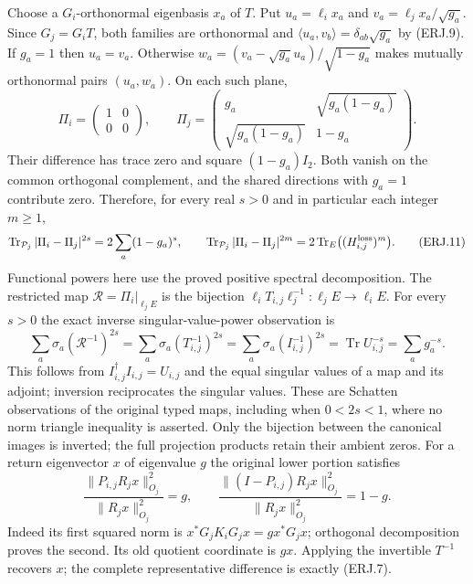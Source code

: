 \documentclass[11pt]{article}
\newcommand{\Tr}{\operatorname{Tr}}\newcommand{\diag}{\operatorname{diag}}
\begin{document}
Choose a $G_i$-orthonormal eigenbasis $x_a$ of $T$. Put
$u_a=\ell_ix_a$ and $v_a=\ell_jx_a/\sqrt{g_a}$.
Since $G_j=G_iT$, both families are orthonormal and
$\langle u_a,v_b\rangle=\delta_{ab}\sqrt{g_a}$ by (ERJ.9).
If $g_a=1$ then $u_a=v_a$. Otherwise
$w_a=(v_a-\sqrt{g_a}u_a)/\sqrt{1-g_a}$ makes mutually
orthonormal pairs $(u_a,w_a)$. On each such plane,
\[
 \Pi_i=\begin{pmatrix}1&0\\0&0\end{pmatrix},\qquad
 \Pi_j=\begin{pmatrix}g_a&\sqrt{g_a(1-g_a)}\\
                    \sqrt{g_a(1-g_a)}&1-g_a\end{pmatrix}.
 \tag{ERJ.10}
\]
Their difference has trace zero and square $(1-g_a)I_2$.
Both vanish on the common orthogonal complement, and the shared
directions with $g_a=1$ contribute zero. Therefore, for every real
$s>0$ and in particular each integer $m\ge1$,
\[
 \Tr_{\mathcal P_j}|\Pi_i-\Pi_j|^{2s}
       =2\sum_a(1-g_a)^s,
 \qquad
 \Tr_{\mathcal P_j}|\Pi_i-\Pi_j|^{2m}
       =2\Tr_E\bigl((H_{i,j}^{\rm loss})^m\bigr).\tag{ERJ.11}
\]
Functional powers here use the proved positive spectral decomposition.
The restricted map $\mathcal R=\Pi_i|_{\ell_jE}$ is the bijection
$\ell_iT_{i,j}\ell_j^{-1}:\ell_jE\to\ell_iE$.
For every $s>0$ the exact inverse singular-value-power observation is
\[
 \sum_a\sigma_a(\mathcal R^{-1})^{2s}
 =\sum_a\sigma_a(T_{i,j}^{-1})^{2s}
 =\sum_a\sigma_a(I_{i,j}^{-1})^{2s}
 =\Tr U_{i,j}^{-s}=\sum_a g_a^{-s}.\tag{ERJ.11a}
\]
This follows from $I_{i,j}^{\dagger}I_{i,j}=U_{i,j}$ and the
equal singular values of a map and its adjoint; inversion reciprocates
the singular values. These are Schatten observations of the original
typed maps, including when $0<2s<1$, where no norm triangle inequality
is asserted. Only the bijection between the canonical images is
inverted; the full projection products retain their ambient zeros.
For a return eigenvector $x$ of eigenvalue $g$ the original lower
portion satisfies
\[
 \frac{\|P_{i,j}R_jx\|_{O_j}^2}{\|R_jx\|_{O_j}^2}=g,
 \qquad
 \frac{\|(I-P_{i,j})R_jx\|_{O_j}^2}{\|R_jx\|_{O_j}^2}=1-g.
 \tag{ERJ.12}
\]
Indeed its first squared norm is $x^*G_jK_iG_jx=gx^*G_jx$;
orthogonal decomposition proves the second. Its old quotient coordinate
is $gx$. Applying the invertible $T^{-1}$ recovers $x$; the complete
representative difference is exactly (ERJ.7).
\end{document}

